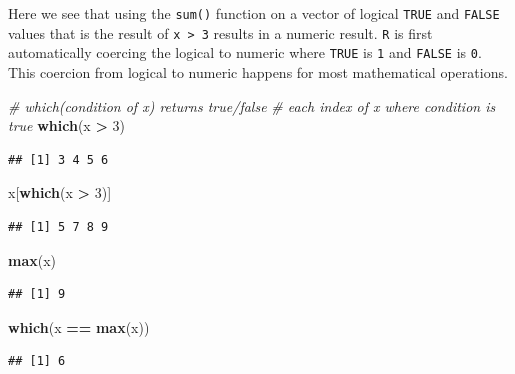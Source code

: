 \documentclass[]{book}
\newenvironment{Shaded}{\begin{snugshade}}{\end{snugshade}}
\newcommand{\KeywordTok}[1]{\textcolor[rgb]{0.13,0.29,0.53}{\textbf{#1}}}
\newcommand{\DecValTok}[1]{\textcolor[rgb]{0.00,0.00,0.81}{#1}}
\newcommand{\StringTok}[1]{\textcolor[rgb]{0.31,0.60,0.02}{#1}}
\newcommand{\CommentTok}[1]{\textcolor[rgb]{0.56,0.35,0.01}{\textit{#1}}}
\newcommand{\OperatorTok}[1]{\textcolor[rgb]{0.81,0.36,0.00}{\textbf{#1}}}
\newcommand{\NormalTok}[1]{#1}
\theoremstyle{definition}
\theoremstyle{definition}
\theoremstyle{definition}
\theoremstyle{remark}
\begin{document}
Here we see that using the \texttt{sum()} function on a vector of
logical \texttt{TRUE} and \texttt{FALSE} values that is the result of
\texttt{x\ \textgreater{}\ 3} results in a numeric result. \texttt{R} is
first automatically coercing the logical to numeric where \texttt{TRUE}
is \texttt{1} and \texttt{FALSE} is \texttt{0}. This coercion from
logical to numeric happens for most mathematical operations.

\begin{Shaded}
\begin{Highlighting}[]
\CommentTok{# which(condition of x) returns true/false  }
\CommentTok{# each index of x where condition is true}
\KeywordTok{which}\NormalTok{(x }\OperatorTok{>}\StringTok{ }\DecValTok{3}\NormalTok{)}
\end{Highlighting}
\end{Shaded}

\begin{verbatim}
## [1] 3 4 5 6
\end{verbatim}

\begin{Shaded}
\begin{Highlighting}[]
\NormalTok{x[}\KeywordTok{which}\NormalTok{(x }\OperatorTok{>}\StringTok{ }\DecValTok{3}\NormalTok{)]}
\end{Highlighting}
\end{Shaded}

\begin{verbatim}
## [1] 5 7 8 9
\end{verbatim}

\begin{Shaded}
\begin{Highlighting}[]
\KeywordTok{max}\NormalTok{(x)}
\end{Highlighting}
\end{Shaded}

\begin{verbatim}
## [1] 9
\end{verbatim}

\begin{Shaded}
\begin{Highlighting}[]
\KeywordTok{which}\NormalTok{(x }\OperatorTok{==}\StringTok{ }\KeywordTok{max}\NormalTok{(x))}
\end{Highlighting}
\end{Shaded}

\begin{verbatim}
## [1] 6
\end{verbatim}
\end{document}
